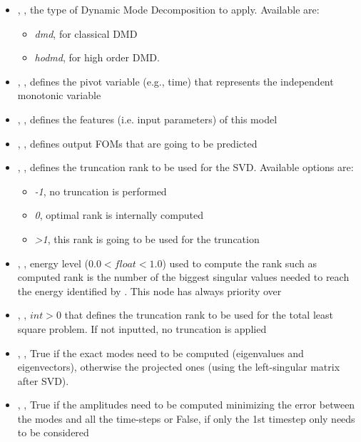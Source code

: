 \begin{itemize}
  \item {}, , the type of Dynamic Mode Decomposition to apply. Available are:
   \begin{itemize}
     \item \textit{dmd}, for classical DMD
     \item \textit{hodmd}, for high order DMD.
   \end{itemize}
  \item {}, , defines the pivot variable (e.g., time) that represents the
  independent monotonic variable
  \item {}, , defines the features (i.e. input parameters) of this
  model
  \item {}, , defines output FOMs that are going to be predicted
  \item {}, , defines the truncation rank to be used for the SVD.
     Available options are:
     \begin{itemize}
     \item \textit{-1}, no truncation is performed
     \item \textit{0}, optimal rank is internally computed
     \item \textit{>1}, this rank is going to be used for the truncation
   \end{itemize}
  \item {}, ,  energy level ($0.0 < float < 1.0$) used to compute the rank such
    as computed rank is the number of the biggest singular values needed to reach the energy identified by
    . This node has always priority over  
  \item {}, , $int > 0$ that defines the truncation rank to be used for the total
   least square problem. If not inputted, no truncation is applied
   \item {}, , True if the exact modes need to be computed (eigenvalues and
   eigenvectors),   otherwise the projected ones (using the left-singular matrix after SVD).
  \item {}, , True if the amplitudes need to be computed minimizing the error
   between the modes and all the time-steps or False, if only the 1st timestep only needs to be considered

\end{itemize}

